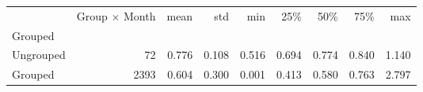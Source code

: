 \begin{tabular}{lrrrrrrrr}
\toprule
{} &  Group $\times$ Month &   mean &    std &    min &    25\% &    50\% &    75\% &    max \\
Grouped   &                       &        &        &        &        &        &        &        \\
\midrule
Ungrouped &                    72 &  0.776 &  0.108 &  0.516 &  0.694 &  0.774 &  0.840 &  1.140 \\
Grouped   &                  2393 &  0.604 &  0.300 &  0.001 &  0.413 &  0.580 &  0.763 &  2.797 \\
\bottomrule
\end{tabular}
